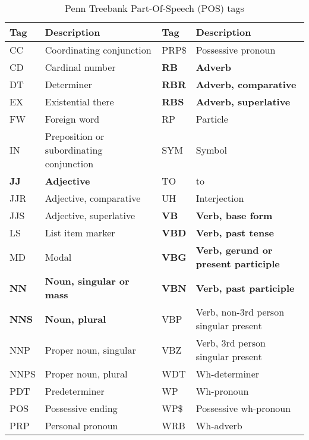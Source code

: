 \begin{table}\centering
	\caption{Penn Treebank Part-Of-Speech (POS) tags}\label{tab:posTags}
   	\begin{tabular}{|l|p{5cm\textwidth}|l|p{5cm\textwidth}|}
   	\hline
   	\textbf{Tag}  & \textbf{Description} & \textbf{Tag}  & \textbf{Description}\\ \hline
	CC &Coordinating conjunction &PRP\$ &Possessive pronoun \\ \hline
	CD &Cardinal number &\textbf{RB} &\textbf{Adverb} \\ \hline
	DT &Determiner &\textbf{RBR} &\textbf{Adverb, comparative} \\ \hline
	EX &Existential there &\textbf{RBS} &\textbf{Adverb, superlative} \\ \hline
	FW &Foreign word &RP &Particle \\ \hline
	IN &Preposition or subordinating conjunction &SYM &Symbol \\ \hline
	\textbf{JJ} &\textbf{Adjective} &TO &to \\ \hline
	JJR &Adjective, comparative &UH &Interjection \\ \hline
	JJS &Adjective, superlative &\textbf{VB} &\textbf{Verb, base form} \\ \hline
	LS &List item marker &\textbf{VBD} &\textbf{Verb, past tense} \\ \hline
	MD &Modal &\textbf{VBG} &\textbf{Verb, gerund or present participle} \\ \hline
	\textbf{NN} &\textbf{Noun, singular or mass} &\textbf{VBN} &\textbf{Verb, past participle} \\ \hline
	\textbf{NNS} &\textbf{Noun, plural} &VBP &Verb, non-3rd person singular present \\ \hline
	NNP &Proper noun, singular &VBZ &Verb, 3rd person singular present \\ \hline
	NNPS &Proper noun, plural &WDT &Wh-determiner \\ \hline
	PDT &Predeterminer &WP &Wh-pronoun \\ \hline
	POS &Possessive ending &WP\$ &Possessive wh-pronoun \\ \hline
	PRP &Personal pronoun &WRB &Wh-adverb \\ \hline
    \end{tabular}
\end{table}


